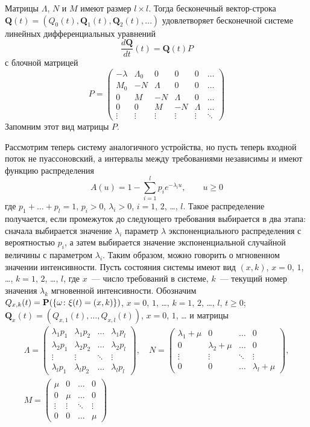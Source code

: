 \documentclass[10pt,oneside,final]{book}
\renewcommand{\Pr}{{\mathbf P}}
\newcommand{\bQ}{{\boldsymbol Q}}
\newcommand*{\hm}[1]{#1\nobreak\discretionary{}%
  {\hbox{$\mathsurround=0pt #1$}}{}}
\begin{document}
Матрицы $\Lambda$, $N$ и $M$ имеют размер $l\times l$. Тогда бесконечный
вектор-строка $\bQ(t)=(Q_0(t), \bQ_1(t), \bQ_2(t), \ldots)$ удовлетворяет
бесконечной системе линейных дифференциальных уравнений
\[
\dfrac{d\bQ}{dt}(t)=\bQ(t)P
\]
с блочной матрицей
\[
P=
\begin{pmatrix}
  -\lambda & \Lambda_0 & 0 & 0 & 0 &\ldots \\
  M_0 & -N & \Lambda & 0 & 0 & \ldots \\
  0 & M & -N & \Lambda & 0 & \ldots \\
  0 & 0 & M & -N & \Lambda & \ldots \\
  \vdots & \vdots & \vdots & \vdots & \vdots & \ddots
\end{pmatrix}
\]
Запомним этот вид матрицы $P$. 

Рассмотрим теперь систему аналогичного устройства, но пусть теперь входной поток
не пуассоновский, а интервалы между требованиями независимы и имеют функцию
распределения 
\[
A(u)=1-\sum_{i=1}^l p_i e^{-\lambda_i u}, \qquad u\geqslant 0
\]
где $p_1+\ldots+p_l=1$, $p_i>0$, $\lambda_i>0$, $i=1$, $2$, \ldots, $l$. 
Такое распределение получается, если промежуток до следующего требования
выбирается в два этапа: сначала выбирается значение $\lambda_i$ параметр $\lambda$ экспоненциального
распределения с вероятностью $p_i$, а затем выбирается значение экспоненциальной
случайной величины с параметром $\lambda_i$. Таким образом, можно говорить о
мгновенном значении интенсивности. Пусть состояния системы имеют вид $(x,k)$,
$x=0$, $1$, \ldots{}, $k=1$, $2$, \ldots, $l$, где $x$~--- число требований в
системе, $k$~--- текущий номер значения $\lambda_k$ мгновенной
интенсивности. Обозначим $Q_{x,k}(t)\hm=\Pr(\{\omega\colon \xi(t)=(x,k)\})$, $x=0$, $1$, \ldots,
$k=1$, $2$, \ldots, $l$, $t\geqslant0$; $\bQ_x(t)=(Q_{x,1}(t), \ldots, Q_{x,l}(t))$, $x=0$, $1$, \ldots{} и матрицы
\begin{gather*}
\Lambda=
\begin{pmatrix}
  \lambda_1p_1 & \lambda_1 p_2 & \ldots  & \lambda_1 p_l\\
  \lambda_2p_1 & \lambda_2 p_2 & \ldots  & \lambda_2 p_l\\
  \vdots & \vdots & \ddots & \vdots\\
  \lambda_l p_1 & \lambda_l p_2 & \ldots  & \lambda_l p_l
\end{pmatrix},
\quad
N=
\begin{pmatrix}
  \lambda_1+\mu & 0 & \ldots & 0\\
  0 & \lambda_2+\mu & \ldots&  0\\
  \vdots & \vdots  & \ddots & \vdots\\
  0 & 0 & \ldots   & \lambda_l+\mu
\end{pmatrix},
\\
M=
\begin{pmatrix}
  \mu & 0 &\ldots  & 0 \\
  0 & \mu & \ldots & 0 \\
  \vdots & \vdots & \ddots & \vdots \\
  0 & 0 & \ldots & \mu
\end{pmatrix}
\end{gather*}
\end{document}
